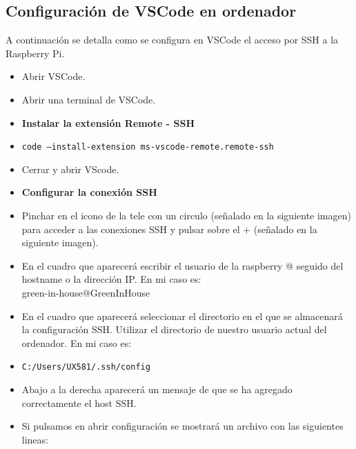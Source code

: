         \subsection{Configuración de VSCode en ordenador}
        A continuación se detalla como se configura en VSCode el acceso por SSH a la Raspberry Pi.
        \begin{itemize}
            \item Abrir VSCode.
            \item Abrir una terminal de VSCode.
            \item \textbf{Instalar la extensión Remote - SSH}
            \item \texttt{code --install-extension ms-vscode-remote.remote-ssh}
            \item Cerrar y abrir VScode.
            \item \textbf{Configurar la conexión SSH}
            \item Pinchar en el icono de la tele con un circulo (señalado en la siguiente imagen) para acceder a las conexiones SSH y pulsar sobre el + (señalado en la siguiente imagen).
            \\ 
            \item En el cuadro que aparecerá escribir el usuario de la raspberry @ seguido del hostname o la dirección IP. En mi caso es:
            \\ green-in-house@GreenInHouse
            \\ 
            \item En el cuadro que aparecerá seleccionar el directorio en el que se almacenará la configuración SSH. Utilizar el directorio de nuestro usuario actual del ordenador. En mi caso es:
            \item \texttt{C:/Users/UX581/.ssh/config}
            \\ 
            \item Abajo a la derecha aparecerá un mensaje de que se ha agregado correctamente el host SSH.
            \\ 
            \item Si pulsamos en abrir configuración se mostrará un archivo con las siguientes lineas:

\end{itemize}
